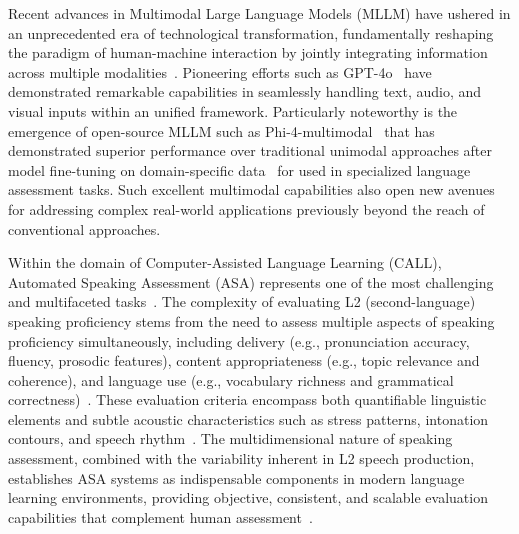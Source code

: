 \documentclass[conference]{IEEEtran}
\begin{document}
Recent advances in Multimodal Large Language Models (MLLM) have ushered in an unprecedented era of technological transformation, fundamentally reshaping the paradigm of human-machine interaction by jointly integrating information across multiple modalities~\cite{Tang2024SALMONN,Qwen2Audio,Microsoft2025Phi4MiniTR,OmniR1}. Pioneering efforts such as GPT-4o~\cite{openai2024gpt4technicalreport} have demonstrated remarkable capabilities in seamlessly handling text, audio, and visual inputs within an unified framework. Particularly noteworthy is the emergence of open-source MLLM such as Phi-4-multimodal~\cite{Microsoft2025Phi4MiniTR} that has demonstrated superior performance over traditional unimodal approaches after model fine-tuning on domain-specific data~\cite{Devlin2019BERT,Baevski20-Wav2Vec2,WangEQM21,BannoM_SLT2022,MLLM2025feedback_lak} for used in specialized language assessment tasks. Such excellent multimodal capabilities also open new avenues for addressing complex real-world applications previously beyond the reach of conventional approaches.

Within the domain of Computer-Assisted Language Learning (CALL), Automated Speaking Assessment (ASA) represents one of the most challenging and multifaceted tasks~\cite{Lo2024AnEA,deJong2023AssessingSL}. The complexity of evaluating L2 (second-language) speaking proficiency stems from the need to assess multiple aspects of speaking proficiency simultaneously, including delivery (e.g., pronunciation accuracy, fluency, prosodic features), content appropriateness (e.g., topic relevance and coherence), and language use (e.g., vocabulary richness and grammatical correctness)~\cite{Lo2024AnEA,ParkU23}. These evaluation criteria encompass both quantifiable linguistic elements and subtle acoustic characteristics such as stress patterns, intonation contours, and speech rhythm~\cite{Banno2023Assessment,kim22k_interspeech}. The multidimensional nature of speaking assessment, combined with the variability inherent in L2 speech production, establishes ASA systems as indispensable components in modern language learning environments, providing objective, consistent, and scalable evaluation capabilities that complement human assessment~\cite{deJong2023AssessingSL}.
\end{document}
